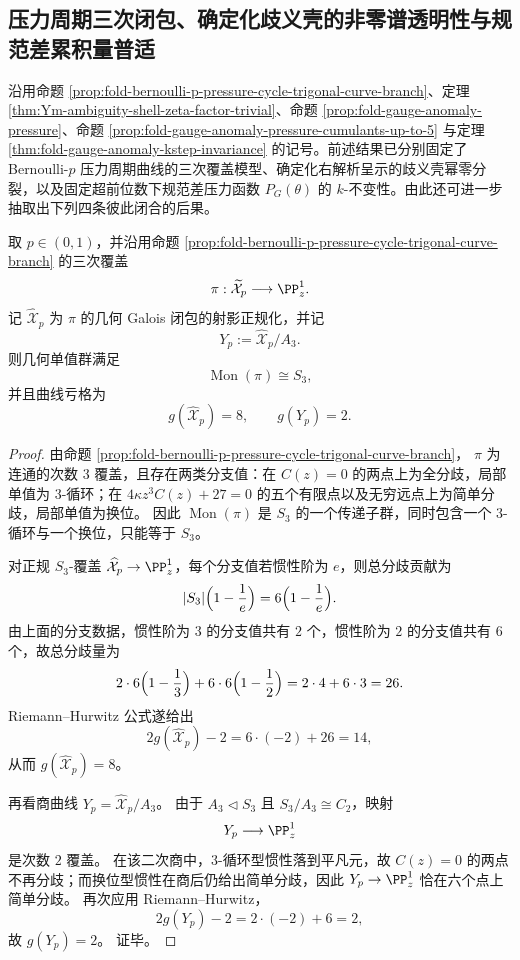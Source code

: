 \subsection{压力周期三次闭包、确定化歧义壳的非零谱透明性与规范差累积量普适}\label{subsec:conclusion-pressure-curve-s3-jordan-cumulant-universality}
沿用命题 \ref{prop:fold-bernoulli-p-pressure-cycle-trigonal-curve-branch}、定理 \ref{thm:Ym-ambiguity-shell-zeta-factor-trivial}、命题 \ref{prop:fold-gauge-anomaly-pressure}、命题 \ref{prop:fold-gauge-anomaly-pressure-cumulants-up-to-5} 与定理 \ref{thm:fold-gauge-anomaly-kstep-invariance} 的记号。前述结果已分别固定了 Bernoulli-\(p\) 压力周期曲线的三次覆盖模型、确定化右解析呈示的歧义壳幂零分裂，以及固定超前位数下规范差压力函数 \(P_G(\theta)\) 的 \(k\)-不变性。由此还可进一步抽取出下列四条彼此闭合的后果。

\begin{theorem}\label{thm:conclusion-pressure-cycle-s3-galois-closure-genus8}
取 \(p\in(0,1)\)，并沿用命题 \ref{prop:fold-bernoulli-p-pressure-cycle-trigonal-curve-branch} 的三次覆盖
\[
\pi:\widetilde{\mathcal X}_p\longrightarrow \PP^1_z.
\]
记 \(\widehat{\mathcal X}_p\) 为 \(\pi\) 的几何 Galois 闭包的射影正规化，并记
\[
Y_p:=\widehat{\mathcal X}_p/A_3.
\]
则几何单值群满足
\[
\operatorname{Mon}(\pi)\cong S_3,
\]
并且曲线亏格为
\[
g(\widehat{\mathcal X}_p)=8,
\qquad
g(Y_p)=2.
\]
\end{theorem}
\begin{proof}
由命题 \ref{prop:fold-bernoulli-p-pressure-cycle-trigonal-curve-branch}，
\(\pi\) 为连通的次数 \(3\) 覆盖，且存在两类分支值：在 \(C(z)=0\) 的两点上为全分歧，局部单值为 \(3\)-循环；在
\(
4\kappa z^3 C(z)+27=0
\)
的五个有限点以及无穷远点上为简单分歧，局部单值为换位。
因此 \(\operatorname{Mon}(\pi)\) 是 \(S_3\) 的一个传递子群，同时包含一个 \(3\)-循环与一个换位，只能等于 \(S_3\)。

对正规 \(S_3\)-覆盖 \(\widehat{\mathcal X}_p\to\PP^1_z\)，每个分支值若惯性阶为 \(e\)，则总分歧贡献为
\[
|S_3|\Bigl(1-\frac{1}{e}\Bigr)=6\Bigl(1-\frac{1}{e}\Bigr).
\]
由上面的分支数据，惯性阶为 \(3\) 的分支值共有 \(2\) 个，惯性阶为 \(2\) 的分支值共有 \(6\) 个，故总分歧量为
\[
2\cdot 6\Bigl(1-\frac13\Bigr)+6\cdot 6\Bigl(1-\frac12\Bigr)
=
2\cdot 4+6\cdot 3
=26.
\]
Riemann--Hurwitz 公式遂给出
\[
2g(\widehat{\mathcal X}_p)-2
=
6\cdot(-2)+26
=14,
\]
从而 \(g(\widehat{\mathcal X}_p)=8\)。

再看商曲线 \(Y_p=\widehat{\mathcal X}_p/A_3\)。
由于 \(A_3\triangleleft S_3\) 且 \(S_3/A_3\cong C_2\)，映射
\[
Y_p\longrightarrow \PP^1_z
\]
是次数 \(2\) 覆盖。
在该二次商中，\(3\)-循环型惯性落到平凡元，故 \(C(z)=0\) 的两点不再分歧；而换位型惯性在商后仍给出简单分歧，因此 \(Y_p\to\PP^1_z\) 恰在六个点上简单分歧。
再次应用 Riemann--Hurwitz，
\[
2g(Y_p)-2
=
2\cdot(-2)+6
=2,
\]
故 \(g(Y_p)=2\)。
证毕。
\end{proof}

